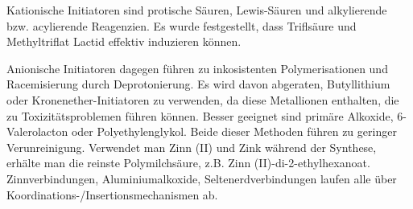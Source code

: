 \documentclass[10pt]{article}
\begin{document}
    Kationische Initiatoren sind protische Säuren, Lewis-Säuren und alkylierende bzw. acylierende Reagenzien.
    Es wurde festgestellt, dass Triflsäure und Methyltriflat Lactid effektiv induzieren können.

    Anionische Initiatoren dagegen führen zu inkosistenten Polymerisationen und Racemisierung durch Deprotonierung.
    Es wird davon abgeraten, Butyllithium oder Kronenether-Initiatoren zu verwenden, da diese Metallionen enthalten, die zu Toxizitätsproblemen führen können.
    Besser geeignet sind primäre Alkoxide, 6-Valerolacton oder Polyethylenglykol.
    Beide dieser Methoden führen zu geringer Verunreinigung.
    Verwendet man Zinn (II) und Zink während der Synthese, erhälte man die reinste Polymilchsäure, z.B. Zinn (II)-di-2-ethylhexanoat.
    Zinnverbindungen, Aluminiumalkoxide, Seltenerdverbindungen laufen alle über Koordinations-/Insertionsmechanismen ab.
\end{document}

